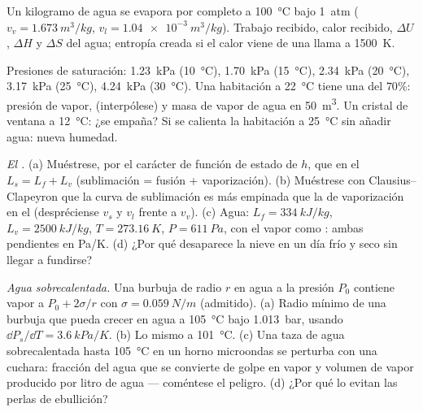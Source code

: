 \begin{exercise}[$\star\star$]\label{exo:b1:phase-changes:8}
Un kilogramo de agua se evapora por completo a \qty{100}{\degreeCelsius} bajo
\qty{1}{atm} ($v_v = \qty{1.673}{m^3/kg}$, $v_l = \qty{1.04e-3}{m^3/kg}$).
Trabajo recibido, calor recibido, $\Delta U$, $\Delta H$ y $\Delta S$ del
agua; entropía creada si el calor viene de una llama a
\qty{1500}{K}.
\end{exercise}

\begin{exercise}[$\star\star$]\label{exo:b1:phase-changes:9}
Presiones de saturación: \qty{1.23}{kPa} (\qty{10}{\degreeCelsius}), \qty{1.70}{kPa}
(\qty{15}{\degreeCelsius}), \qty{2.34}{kPa} (\qty{20}{\degreeCelsius}), \qty{3.17}{kPa}
(\qty{25}{\degreeCelsius}), \qty{4.24}{kPa} (\qty{30}{\degreeCelsius}). Una
habitación a \qty{22}{\degreeCelsius} tiene una  del $70\%$:
presión de vapor,  (interpólese) y masa de vapor de agua en
\qty{50}{m^3}. Un cristal de ventana a \qty{12}{\degreeCelsius}: ¿se empaña?
Si se calienta la habitación a \qty{25}{\degreeCelsius} sin añadir agua:
nueva humedad.
\end{exercise}

\begin{exercise}[$\star\star\star$]\label{exo:b1:phase-changes:10}
\emph{El .} (a) Muéstrese, por el carácter de función de
estado de $h$, que en el  $L_s = L_f + L_v$ (sublimación =
fusión + vaporización). (b) Muéstrese con Clausius--Clapeyron que la curva
de sublimación es más empinada que la de vaporización en el 
(despréciense $v_s$ y $v_l$ frente a $v_v$). (c) Agua: $L_f = \qty{334}{kJ/kg}$,
$L_v = \qty{2500}{kJ/kg}$, $T = \qty{273.16}{K}$, $P = \qty{611}{Pa}$, con el vapor
como : ambas pendientes en \unit{Pa/K}. (d) ¿Por qué
desaparece la nieve en un día frío y seco sin llegar a fundirse?
\end{exercise}

\begin{exercise}[$\star\star\star$]\label{exo:b1:phase-changes:11}
\emph{Agua sobrecalentada.} Una burbuja de radio $r$ en agua a la presión
$P_0$ contiene vapor a $P_0 + 2\sigma/r$ con $\sigma = \qty{0.059}{N/m}$
(admitido). (a) Radio mínimo de una burbuja que pueda crecer en agua a
\qty{105}{\degreeCelsius} bajo \qty{1.013}{bar}, usando
$\dd P_s/\dd T = \qty{3.6}{kPa/K}$. (b) Lo mismo a \qty{101}{\degreeCelsius}.
(c) Una taza de agua sobrecalentada hasta \qty{105}{\degreeCelsius} en un
horno microondas se perturba con una cuchara: fracción del agua que se
convierte de golpe en vapor y volumen de vapor producido por litro de
agua --- coméntese el peligro. (d) ¿Por qué lo evitan las perlas de ebullición?
\end{exercise}

